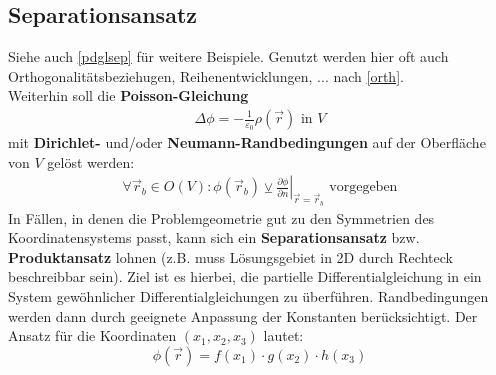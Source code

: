  \subsection{Separationsansatz}\label{sep}
 Siehe auch \ref{pdglsep} für weitere Beispiele. Genutzt werden hier oft auch Orthogonalitätsbeziehugen, Reihenentwicklungen, ... nach \ref{orth}.\\
 Weiterhin soll die \textbf{Poisson-Gleichung}
	        \begin{equation}\begin{split}
			        \Delta \phi = -\frac{1}{\varepsilon_0} \rho(\vec{r} ) \text{ in } V
		        \end{split}\end{equation}
	        mit \textbf{Dirichlet-} und/oder \textbf{Neumann-Randbedingungen} auf der Oberfläche von $V$ gelöst werden:
	        \begin{equation}\begin{split}
			        \forall \vec{r} _{b} \in O(V) : \phi(\vec{r} _b) \veebar \left. \frac{\partial \phi}{\partial n}\right|_{\vec{r} =\vec{r} _b} \text{ vorgegeben}
		        \end{split}\end{equation}
	   In Fällen, in denen die Problemgeometrie gut zu den Symmetrien des Koordinatensystems passt, kann sich ein \textbf{Separationsansatz} bzw. \textbf{Produktansatz} lohnen (z.B. muss Lösungsgebiet in 2D durch Rechteck beschreibbar sein).
	   Ziel ist es hierbei, die partielle Differentialgleichung in ein System gewöhnlicher Differentialgleichungen zu überführen. Randbedingungen werden dann durch geeignete Anpassung der Konstanten berücksichtigt.
	   Der Ansatz für die Koordinaten $(x_1,x_2,x_3)$ lautet: \begin{equation}\boxed{\phi(\vec{r} )= f(x_1) \cdot g(x_2) \cdot h(x_3) }\end{equation}
